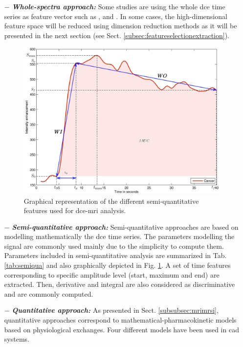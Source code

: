 \begin{enumerate}[leftmargin=*]

\item[$-$] \textbf{\textit{Whole-spectra approach:}} Some studies are using the whole \ac{dce} time series as feature vector such as \cite{Ampeliotis2007,Ampeliotis2008}, \cite{Tiwari2012} and \cite{Viswanath2008a,Viswanath2008}. In some cases, the high-dimensional feature space will be reduced using dimension reduction methods as it will be presented in the next section (see Sect. \ref{subsec:featureselectionextraction}).

\begin{figure}
	\centering
	\includegraphics[width=.8\linewidth]{04_data_classification/06_feature_detection/figures/dce/dce_cancer_parameters.eps}
	\caption{Graphical representation of the different semi-quantitative features used for \ac{dce}-\ac{mri} analysis.}
	\label{fig:dceparam}
\end{figure}

\item[$-$] \textbf{\textit{Semi-quantitative approach:}} Semi-quantitative approaches are based on modelling mathematically the \ac{dce} time series. The parameters modelling the signal are commonly used mainly due to the simplicity to compute them. Parameters included in semi-quantitative analysis are summarized in Tab. \ref{tab:semiqua} and also graphically depicted in Fig. \ref{fig:dceparam}. A set of time features corresponding to specific amplitude level (start, maximum and end) are extracted. Then, derivative and integral are also considered as discriminative and are commonly computed.

\item[$-$] \textbf{\textit{Quantitative approach:}} As presented in Sect. \ref{subsubsec:mrimrsi}, quantitative approaches correspond to mathematical-pharmacokinetic models based on physiological exchanges. Four different models have been used in \ac{cad} systems. 


\end{enumerate}
